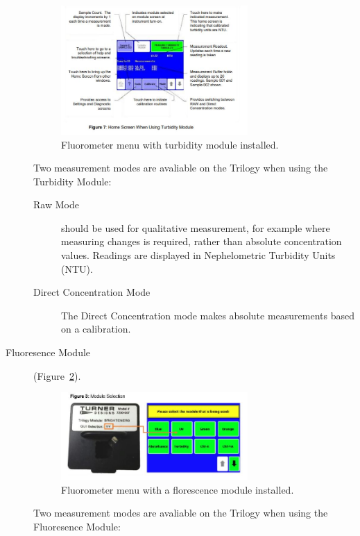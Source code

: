 \documentclass[12pt]{../SOP4_alpha}\usepackage[]{graphicx}\usepackage[]{color}
\begin{document}
\begin{description}
\begin{figure}
  \centering
  \includegraphics[width=0.7\textwidth]{figure6turbidity}
  \caption{Fluorometer menu with turbidity module installed.}
  \label{fig:trubiditymenu}
\end{figure}  
  
  
  \NP Two measurement modes are avaliable on the Trilogy when using the Turbidity Module:

\begin{description}
\item[Raw Mode] should be used for qualitative measurement, for example where measuring changes is required, rather than absolute concentration values. Readings are displayed in Nephelometric Turbidity Units (NTU).
  \item[Direct Concentration Mode] The Direct Concentration mode makes absolute measurements based on a calibration.
\end{description}

  \item[Fluoresence Module]
  
(Figure~\ref{fig:modulemenu}).

\begin{figure}
  \centering
  \includegraphics[width=0.7\textwidth]{Capture3}
  \caption{Fluorometer menu with a florescence module installed.}
  \label{fig:modulemenu}
\end{figure}

\NP Two measurement modes are avaliable on the Trilogy when using the Fluoresence Module:


\end{description}
\end{document}
